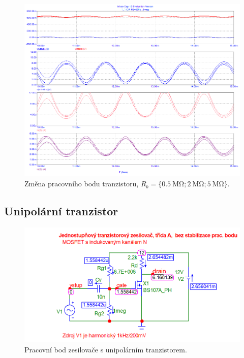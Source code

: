 \documentclass{protokol}
\begin{document}
	\begin{figure}[h!]
		\centering
		\includegraphics[width=\textwidth]{microcap/BJT/Prubehy_2_RB_500k-5M.png}
		\centering
		\caption{Změna pracovního bodu tranzistoru, $ R_{b}= \{\SI{0.5}{\mega\ohm};\SI{2}{\mega\ohm};\SI{5}{\mega\ohm}\} $.}
		\label{fig:-mc_}
	\end{figure}

\clearpage
\subsection{Unipolární tranzistor}	
	\begin{figure}[h!]
		\centering
		\includegraphics[width=\textwidth]{microcap/xFET/1_Pracovni_bod_zesilovace.png}
		\centering
		\caption{Pracovní bod zesilovače s unipolárním tranzistorem.}
		\label{fig:mc_ut_prac_bod}
	\end{figure}
	
\end{document}
